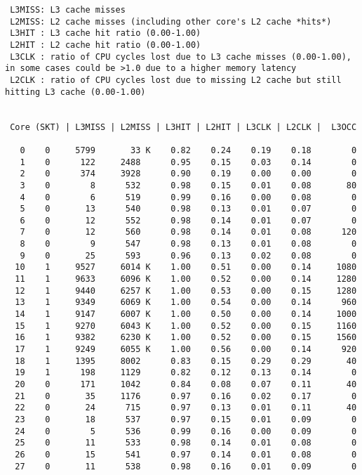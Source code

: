 


\begin{lstlisting}
 L3MISS: L3 cache misses 
 L2MISS: L2 cache misses (including other core's L2 cache *hits*) 
 L3HIT : L3 cache hit ratio (0.00-1.00)
 L2HIT : L2 cache hit ratio (0.00-1.00)
 L3CLK : ratio of CPU cycles lost due to L3 cache misses (0.00-1.00), in some cases could be >1.0 due to a higher memory latency
 L2CLK : ratio of CPU cycles lost due to missing L2 cache but still hitting L3 cache (0.00-1.00)


 Core (SKT) | L3MISS | L2MISS | L3HIT | L2HIT | L3CLK | L2CLK |  L3OCC

   0    0     5799       33 K    0.82    0.24    0.19    0.18        0
   1    0      122     2488      0.95    0.15    0.03    0.14        0
   2    0      374     3928      0.90    0.19    0.00    0.00        0
   3    0        8      532      0.98    0.15    0.01    0.08       80
   4    0        6      519      0.99    0.16    0.00    0.08        0
   5    0       13      540      0.98    0.13    0.01    0.07        0
   6    0       12      552      0.98    0.14    0.01    0.07        0
   7    0       12      560      0.98    0.14    0.01    0.08      120
   8    0        9      547      0.98    0.13    0.01    0.08        0
   9    0       25      593      0.96    0.13    0.02    0.08        0
  10    1     9527     6014 K    1.00    0.51    0.00    0.14     1080
  11    1     9633     6096 K    1.00    0.52    0.00    0.14     1280
  12    1     9440     6257 K    1.00    0.53    0.00    0.15     1280
  13    1     9349     6069 K    1.00    0.54    0.00    0.14      960
  14    1     9147     6007 K    1.00    0.50    0.00    0.14     1000
  15    1     9270     6043 K    1.00    0.52    0.00    0.15     1160
  16    1     9382     6230 K    1.00    0.52    0.00    0.15     1560
  17    1     9249     6055 K    1.00    0.56    0.00    0.14      920
  18    1     1395     8002      0.83    0.15    0.29    0.29       40
  19    1      198     1129      0.82    0.12    0.13    0.14        0
  20    0      171     1042      0.84    0.08    0.07    0.11       40
  21    0       35     1176      0.97    0.16    0.02    0.17        0
  22    0       24      715      0.97    0.13    0.01    0.11       40
  23    0       18      537      0.97    0.15    0.01    0.09        0
  24    0        5      536      0.99    0.16    0.00    0.09        0
  25    0       11      533      0.98    0.14    0.01    0.08        0
  26    0       15      541      0.97    0.14    0.01    0.08        0
  27    0       11      538      0.98    0.16    0.01    0.09        0

\end{lstlisting}
